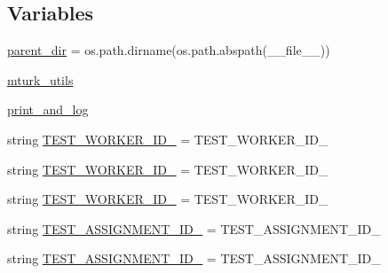 \subsection*{Variables}
\begin{DoxyCompactItemize}
\item 
\hyperlink{namespaceparlai_1_1mturk_1_1core_1_1legacy__2018_1_1test_1_1test__mturk__manager_a11191a36250e9e1b1449f107bfc70049}{parent\+\_\+dir} = os.\+path.\+dirname(os.\+path.\+abspath(\+\_\+\+\_\+file\+\_\+\+\_\+))
\item 
\hyperlink{namespaceparlai_1_1mturk_1_1core_1_1legacy__2018_1_1test_1_1test__mturk__manager_aa43a14f8e1e8f5a33b33f514e44245d4}{mturk\+\_\+utils}
\item 
\hyperlink{namespaceparlai_1_1mturk_1_1core_1_1legacy__2018_1_1test_1_1test__mturk__manager_a71fc06264753d6b9aa4b748a73b761b7}{print\+\_\+and\+\_\+log}
\item 
string \hyperlink{namespaceparlai_1_1mturk_1_1core_1_1legacy__2018_1_1test_1_1test__mturk__manager_a0094a42447f7077ceefa6e24805c806b}{T\+E\+S\+T\+\_\+\+W\+O\+R\+K\+E\+R\+\_\+\+I\+D\+\_} = \textquotesingle{}T\+E\+S\+T\+\_\+\+W\+O\+R\+K\+E\+R\+\_\+\+I\+D\+\_\textquotesingle{}
\item 
string \hyperlink{namespaceparlai_1_1mturk_1_1core_1_1legacy__2018_1_1test_1_1test__mturk__manager_a6ecf74558c41028c009e446246aa7ed1}{T\+E\+S\+T\+\_\+\+W\+O\+R\+K\+E\+R\+\_\+\+I\+D\+\_} = \textquotesingle{}T\+E\+S\+T\+\_\+\+W\+O\+R\+K\+E\+R\+\_\+\+I\+D\+\_\textquotesingle{}
\item 
string \hyperlink{namespaceparlai_1_1mturk_1_1core_1_1legacy__2018_1_1test_1_1test__mturk__manager_ac0a5e451cba1f0bad274f47edcfd5b1d}{T\+E\+S\+T\+\_\+\+W\+O\+R\+K\+E\+R\+\_\+\+I\+D\+\_} = \textquotesingle{}T\+E\+S\+T\+\_\+\+W\+O\+R\+K\+E\+R\+\_\+\+I\+D\+\_\textquotesingle{}
\item 
string \hyperlink{namespaceparlai_1_1mturk_1_1core_1_1legacy__2018_1_1test_1_1test__mturk__manager_a6c39c12aa2c5fd6dbdc999829b4fda65}{T\+E\+S\+T\+\_\+\+A\+S\+S\+I\+G\+N\+M\+E\+N\+T\+\_\+\+I\+D\+\_} = \textquotesingle{}T\+E\+S\+T\+\_\+\+A\+S\+S\+I\+G\+N\+M\+E\+N\+T\+\_\+\+I\+D\+\_\textquotesingle{}
\item 
string \hyperlink{namespaceparlai_1_1mturk_1_1core_1_1legacy__2018_1_1test_1_1test__mturk__manager_ae28bcd84c0029fd952911a59d771e424}{T\+E\+S\+T\+\_\+\+A\+S\+S\+I\+G\+N\+M\+E\+N\+T\+\_\+\+I\+D\+\_} = \textquotesingle{}T\+E\+S\+T\+\_\+\+A\+S\+S\+I\+G\+N\+M\+E\+N\+T\+\_\+\+I\+D\+\_\textquotesingle{}
\item 

\end{DoxyCompactItemize}
